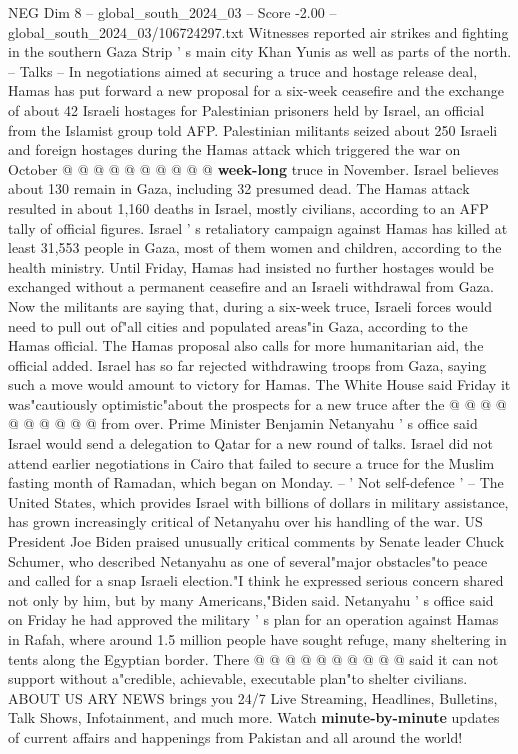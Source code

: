 \begin{textsample}{NEG Dim 8 – global\_south\_2024\_03 – Score -2.00 – global\_south\_2024\_03/106724297.txt}
Witnesses reported air strikes and fighting in the southern Gaza Strip ' s main city Khan Yunis as well as parts of the north. -- Talks -- In negotiations aimed at securing a truce and hostage release deal, Hamas has put forward a new proposal for a six-week ceasefire and the exchange of about 42 Israeli hostages for Palestinian prisoners held by Israel, an official from the Islamist group told AFP.
Palestinian militants seized about 250 Israeli and foreign hostages during the Hamas attack which triggered the war on October @ @ @ @ @ @ @ @ @ @ \textbf{week-long} truce in November.
Israel believes about 130 remain in Gaza, including 32 presumed dead.
The Hamas attack resulted in about 1,160 deaths in Israel, mostly civilians, according to an AFP tally of official figures.
Israel ' s retaliatory campaign against Hamas has killed at least 31,553 people in Gaza, most of them women and children, according to the health ministry.
Until Friday, Hamas had insisted no further hostages would be exchanged without a permanent ceasefire and an Israeli withdrawal from Gaza.
Now the militants are saying that, during a six-week truce, Israeli forces would need to pull out of"all cities and populated areas"in Gaza, according to the Hamas official.
The Hamas proposal also calls for more humanitarian aid, the official added.
Israel has so far rejected withdrawing troops from Gaza, saying such a move would amount to victory for Hamas.
The White House said Friday it was"cautiously optimistic"about the prospects for a new truce after the @ @ @ @ @ @ @ @ @ @ from over.
Prime Minister Benjamin Netanyahu ' s office said Israel would send a delegation to Qatar for a new round of talks.
Israel did not attend earlier negotiations in Cairo that failed to secure a truce for the Muslim fasting month of Ramadan, which began on Monday. -- ' Not self-defence ' -- The United States, which provides Israel with billions of dollars in military assistance, has grown increasingly critical of Netanyahu over his handling of the war.
US President Joe Biden praised unusually critical comments by Senate leader Chuck Schumer, who described Netanyahu as one of several"major obstacles"to peace and called for a snap Israeli election."I think he expressed serious concern shared not only by him, but by many Americans,"Biden said.
Netanyahu ' s office said on Friday he had approved the military ' s plan for an operation against Hamas in Rafah, where around 1.5 million people have sought refuge, many sheltering in tents along the Egyptian border.
There @ @ @ @ @ @ @ @ @ @ said it can not support without a"credible, achievable, executable plan"to shelter civilians.
ABOUT US ARY NEWS brings you 24/7 Live Streaming, Headlines, Bulletins, Talk Shows, Infotainment, and much more.
Watch \textbf{minute-by-minute} updates of current affairs and happenings from Pakistan and all around the world!

\end{textsample}
